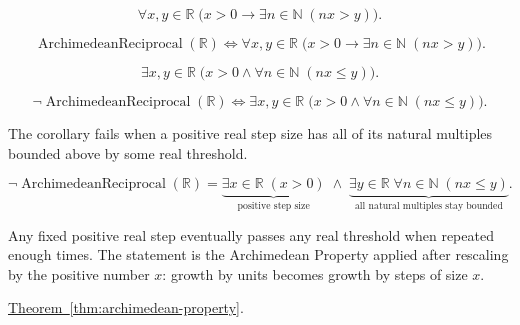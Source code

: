 \begin{remark*}
\[
\forall x,y\in\mathbb{R}\;\bigl(x>0\rightarrow \exists n\in\mathbb{N}\;(nx>y)\bigr).
\]
\end{remark*}

\begin{remark*}
\[
\operatorname{ArchimedeanReciprocal}(\mathbb{R})\Longleftrightarrow
\forall x,y\in\mathbb{R}\;\bigl(x>0\rightarrow \exists n\in\mathbb{N}\;(nx>y)\bigr).
\]
\end{remark*}

\begin{remark*}
\[
\exists x,y\in\mathbb{R}\;\bigl(x>0\land \forall n\in\mathbb{N}\;(nx\le y)\bigr).
\]
\end{remark*}

\begin{remark*}
\[
\neg\operatorname{ArchimedeanReciprocal}(\mathbb{R})\Longleftrightarrow
\exists x,y\in\mathbb{R}\;\bigl(x>0\land \forall n\in\mathbb{N}\;(nx\le y)\bigr).
\]
\end{remark*}

\begin{remark*}
The corollary fails when a positive real step size has all of its natural multiples bounded above by some real threshold.
\end{remark*}

\begin{remark*}
\[
\neg\operatorname{ArchimedeanReciprocal}(\mathbb{R})
=
\underbrace{\exists x\in\mathbb{R}\;(x>0)}_{\text{positive step size}}
\;\land\;
\underbrace{\exists y\in\mathbb{R}\;\forall n\in\mathbb{N}\;(nx\le y)}_{\text{all natural multiples stay bounded}}.
\]
\end{remark*}

\begin{remark*}[Interpretation]
Any fixed positive real step eventually passes any real threshold when repeated enough times. The statement is the Archimedean Property applied after rescaling by the positive number $x$: growth by units becomes growth by steps of size $x$.
\end{remark*}

\begin{remark*}[Dependencies]
\hyperref[thm:archimedean-property]{Theorem~\ref*{thm:archimedean-property}}.
\end{remark*}
